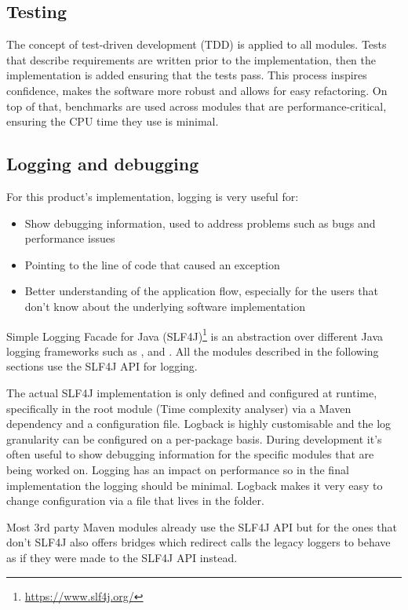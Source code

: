 \subsection{Testing}
The concept of test-driven development (TDD) is applied to all modules. Tests that describe requirements are written prior to the implementation, then the implementation is added ensuring that the tests pass. This process inspires confidence, makes the software more robust and allows for easy refactoring. On top of that, benchmarks are used across modules that are performance-critical, ensuring the CPU time they use is minimal.

\subsection{Logging and debugging}
For this product's implementation, logging is very useful for:
\begin{itemize}
  \item Show debugging information, used to address problems such as bugs and performance issues
  \item Pointing to the line of code that caused an exception
  \item Better understanding of the application flow, especially for the users that don't know about the underlying software implementation
\end{itemize}

\noindent Simple Logging Facade for Java (SLF4J)\footnote{\url{https://www.slf4j.org/}} is an abstraction over different Java logging frameworks such as ,  and . All the modules described in the following sections use the SLF4J API for logging.

\noindent The actual SLF4J implementation is only defined and configured at runtime, specifically in the root module (Time complexity analyser) via a Maven dependency and a configuration file. Logback is highly customisable and the log granularity can be configured on a per-package basis. During development it's often useful to show debugging information for the specific modules that are being worked on. Logging has an impact on performance so in the final implementation the logging should be minimal. Logback makes it very easy to change configuration via a  file that lives in the  folder.

\noindent Most 3rd party Maven modules already use the SLF4J API but for the ones that don't SLF4J also offers bridges which redirect calls the legacy loggers to behave as if they were made to the SLF4J API instead.

